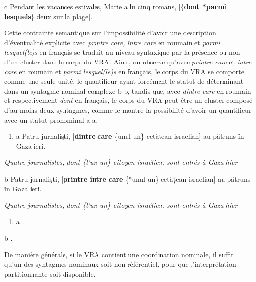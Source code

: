   c  Pendant les vacances estivales, Marie a lu cinq romans, [\{\textbf{dont {\textbar} *parmi lesquels}\} deux sur la plage].

Cette contrainte sémantique sur l'impossibilité d'avoir une description d'éventualité explicite avec \textit{printre care, între care} en roumain et \textit{parmi lesquel(le)s} en français se traduit au niveau syntaxique par la présence ou non d'un cluster dans le corps du VRA. Ainsi, on observe qu'avec \textit{printre care} et \textit{între care} en roumain et \textit{parmi lesquel(le)s} en français, le corps du VRA se comporte comme une seule unité, le quantifieur ayant forcément le statut de déterminant dans un syntagme nominal complexe b-b, tandis que, avec \textit{dintre care} en roumain et respectivement \textit{dont} en français, le corps du VRA peut être un cluster composé d'au moins deux syntagmes, comme le montre la possibilité d'avoir un quantifieur avec un statut pronominal a-a.  


\begin{enumerate}
\item \label{bkm:Ref295319261}a  Patru jurnalişti, [\textbf{dintre} \textbf{care} \{unul {\textbar} un\} cetățean israelian] au pătruns în Gaza ieri.  


\end{enumerate}
{\itshape
Quatre journalistes, dont \{l'un {\textbar} un\} citoyen israélien, sont entrés à Gaza hier}

  b  Patru jurnalişti, [\textbf{printre {\textbar} între} \textbf{care} \{*unul {\textbar} un\} cetățean israelian] au pătruns în Gaza ieri.

{\itshape
Quatre journalistes, dont \{l'un {\textbar} un\} citoyen israélien, sont entrés à Gaza hier}


\begin{enumerate}
\item \label{bkm:Ref295319263}a  . 


\end{enumerate}
  b  .

De manière générale, si le VRA contient une coordination nominale, il suffit qu'un des syntagmes nominaux soit non-référentiel, pour que l'interprétation partitionnante soit disponible.


